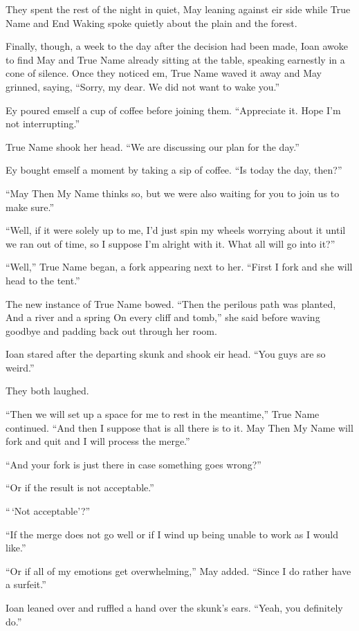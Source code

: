 They spent the rest of the night in quiet, May leaning against eir side while True Name and End Waking spoke quietly about the plain and the forest.

Finally, though, a week to the day after the decision had been made, Ioan awoke to find May and True Name already sitting at the table, speaking earnestly in a cone of silence. Once they noticed em, True Name waved it away and May grinned, saying, ``Sorry, my dear. We did not want to wake you.''

Ey poured emself a cup of coffee before joining them. ``Appreciate it. Hope I'm not interrupting.''

True Name shook her head. ``We are discussing our plan for the day.''

Ey bought emself a moment by taking a sip of coffee. ``Is today the day, then?''

``May Then My Name thinks so, but we were also waiting for you to join us to make sure.''

``Well, if it were solely up to me, I'd just spin my wheels worrying about it until we ran out of time, so I suppose I'm alright with it. What all will go into it?''

``Well,'' True Name began, a fork appearing next to her. ``First I fork and she will head to the tent.''

The new instance of True Name bowed. ``Then the perilous path was planted, And a river and a spring On every cliff and tomb,'' she said before waving goodbye and padding back out through her room.

Ioan stared after the departing skunk and shook eir head. ``You guys are so weird.''

They both laughed.

``Then we will set up a space for me to rest in the meantime,'' True Name continued. ``And then I suppose that is all there is to it. May Then My Name will fork and quit and I will process the merge.''

``And your fork is just there in case something goes wrong?''

``Or if the result is not acceptable.''

``\,`Not acceptable'?''

``If the merge does not go well or if I wind up being unable to work as I would like.''

``Or if all of my emotions get overwhelming,'' May added. ``Since I do rather have a surfeit.''

Ioan leaned over and ruffled a hand over the skunk's ears. ``Yeah, you definitely do.''

